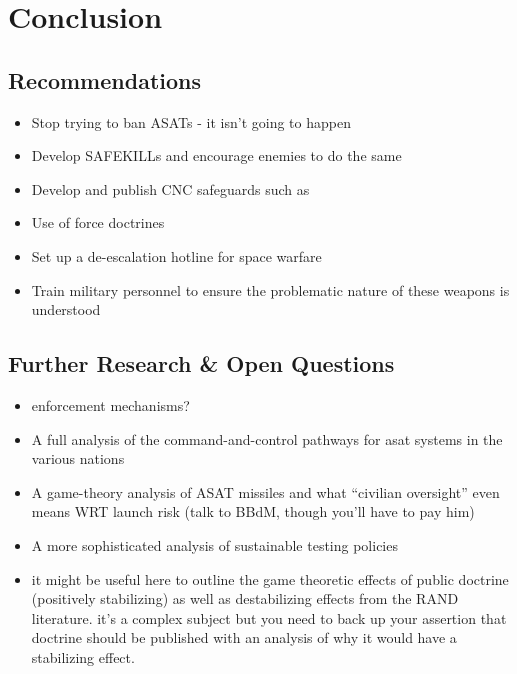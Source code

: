 \section{Conclusion}

\subsection{Recommendations}
\begin{itemize}

\item Stop trying to ban ASATs - it isn't going to happen
\item Develop SAFEKILLs and encourage enemies to do the same
\item Develop and publish CNC safeguards such as
\item Use of force doctrines
\item Set up a de-escalation hotline for space warfare

\item Train military personnel to ensure the problematic nature of
  these weapons is understood

\end{itemize}


\subsection{Further Research \& Open Questions}
\begin{itemize}

\item enforcement mechanisms?

\item A full analysis of the command-and-control pathways for asat
  systems in the various nations

\item A game-theory analysis of ASAT missiles and what ``civilian
  oversight'' even means WRT launch risk (talk to BBdM, though you'll
  have to pay him)

\item A more sophisticated analysis of sustainable testing policies

\item it might be useful here to outline the game theoretic effects of
  public doctrine (positively stabilizing) as well as destabilizing
  effects from the RAND literature. it's a complex subject but you
  need to back up your assertion that doctrine should be published
  with an analysis of why it would have a stabilizing effect.

\end{itemize}

